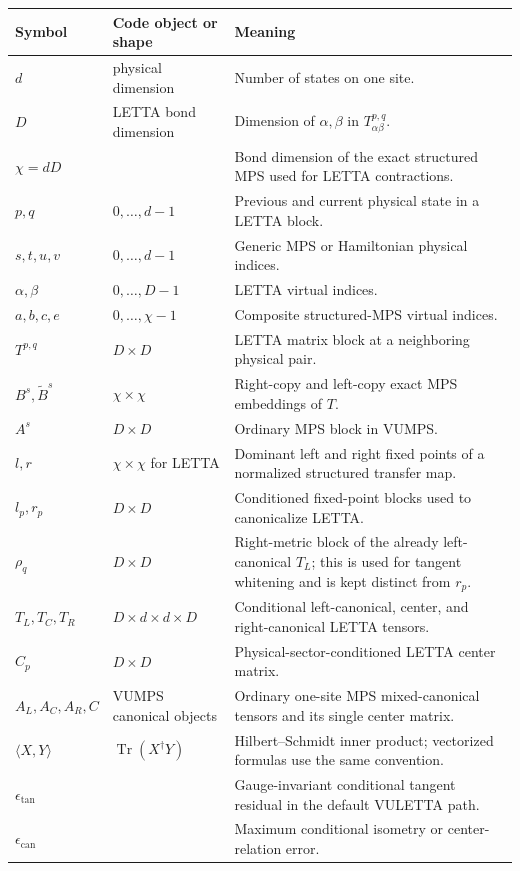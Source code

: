\documentclass[11pt]{article}
\newcommand{\Tr}{\operatorname{Tr}}
\newcommand{\code}[1]{\texttt{\detokenize{#1}}}
\begin{document}
\begingroup
\small
\begin{longtable}{p{}p{}p{}}
\toprule
Symbol & Code object or shape & Meaning \\
\midrule
\endhead
$d$ & physical dimension & Number of states on one site. \\
$D$ & LETTA bond dimension & Dimension of $\alpha,\beta$ in $T^{p,q}_{\alpha\beta}$. \\
$\chi=dD$ & \code{effective_bond_dim} & Bond dimension of the exact structured MPS used for LETTA contractions. \\
$p,q$ & $0,\ldots,d-1$ & Previous and current physical state in a LETTA block. \\
$s,t,u,v$ & $0,\ldots,d-1$ & Generic MPS or Hamiltonian physical indices. \\
$\alpha,\beta$ & $0,\ldots,D-1$ & LETTA virtual indices. \\
$a,b,c,e$ & $0,\ldots,\chi-1$ & Composite structured-MPS virtual indices. \\
$T^{p,q}$ & $D\times D$ & LETTA matrix block at a neighboring physical pair. \\
$B^s,\widetilde B^s$ & $\chi\times\chi$ & Right-copy and left-copy exact MPS embeddings of $T$. \\
$A^s$ & $D\times D$ & Ordinary MPS block in VUMPS. \\
$l,r$ & $\chi\times\chi$ for LETTA & Dominant left and right fixed points of a normalized structured transfer map. \\
$l_p,r_p$ & $D\times D$ & Conditioned fixed-point blocks used to canonicalize LETTA. \\
$\rho_q$ & $D\times D$ & Right-metric block of the already left-canonical $T_L$; this is used for tangent whitening and is kept distinct from $r_p$. \\
$T_L,T_C,T_R$ & $D\times d\times d\times D$ & Conditional left-canonical, center, and right-canonical LETTA tensors. \\
$C_p$ & $D\times D$ & Physical-sector-conditioned LETTA center matrix. \\
$A_L,A_C,A_R,C$ & VUMPS canonical objects & Ordinary one-site MPS mixed-canonical tensors and its single center matrix. \\
$\langle X,Y\rangle$ & $\Tr(X^\dagger Y)$ & Hilbert--Schmidt inner product; vectorized formulas use the same convention. \\
$\epsilon_{\mathrm{tan}}$ & \code{residual_norm} & Gauge-invariant conditional tangent residual in the default VULETTA path. \\
$\epsilon_{\mathrm{can}}$ &
\code{canonical_}\allowbreak\code{residual_norm} &
Maximum conditional isometry or center-relation error. \\
\bottomrule
\end{longtable}
\endgroup
\end{document}
